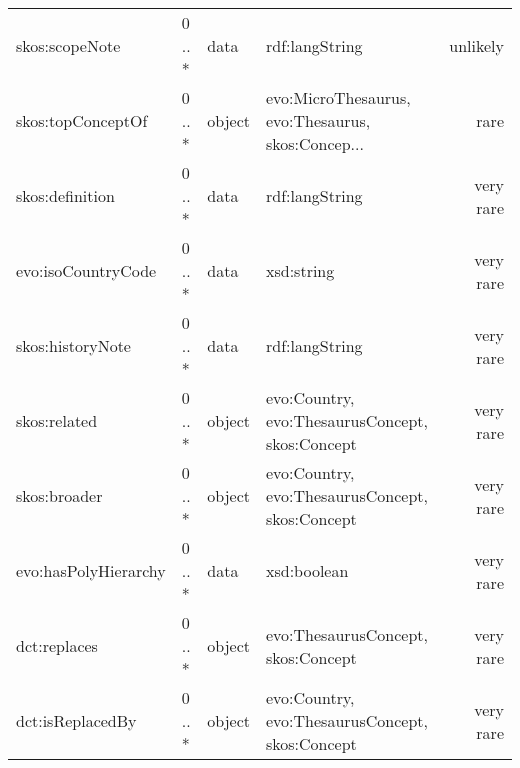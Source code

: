 \documentclass[10pt,a4paper,titlepage,final]{article}
\begin{document}
\begin{tabularx}{\textwidth}{lllXr}
         skos:scopeNote &      0 .. * &    data &                                     rdf:langString &   unlikely \\
      skos:topConceptOf &      0 .. * &  object &  evo:MicroThesaurus, evo:Thesaurus, skos:Concep... &       rare \\
        skos:definition &      0 .. * &    data &                                     rdf:langString &  very rare \\
     evo:isoCountryCode &      0 .. * &    data &                                         xsd:string &  very rare \\
       skos:historyNote &      0 .. * &    data &                                     rdf:langString &  very rare \\
           skos:related &      0 .. * &  object &    evo:Country, evo:ThesaurusConcept, skos:Concept &  very rare \\
           skos:broader &      0 .. * &  object &    evo:Country, evo:ThesaurusConcept, skos:Concept &  very rare \\
   evo:hasPolyHierarchy &      0 .. * &    data &                                        xsd:boolean &  very rare \\
           dct:replaces &      0 .. * &  object &                 evo:ThesaurusConcept, skos:Concept &  very rare \\
       dct:isReplacedBy &      0 .. * &  object &    evo:Country, evo:ThesaurusConcept, skos:Concept &  very rare \\
\end{tabularx}
\end{document}
